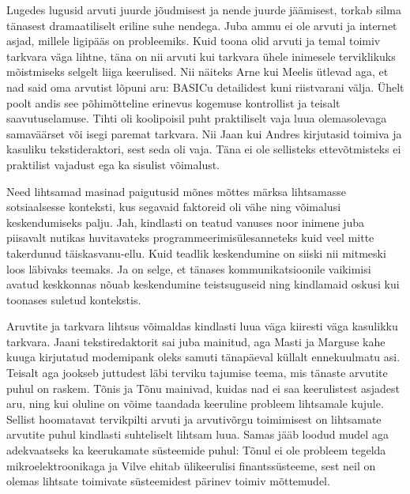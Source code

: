 Lugedes lugusid arvuti juurde jõudmisest ja nende juurde jäämisest, torkab silma tänasest dramaatiliselt eriline suhe nendega. Juba ammu ei ole arvuti ja internet asjad, millele ligipääs on probleemiks. Kuid toona olid arvuti ja temal toimiv tarkvara väga lihtne, täna on nii arvuti kui tarkvara ühele inimesele terviklikuks mõistmiseks selgelt liiga keerulised. Nii näiteks Arne kui Meelis ütlevad aga, et nad said oma arvutist lõpuni aru: BASICu detailidest kuni riistvarani välja. Ühelt poolt andis see põhimõtteline erinevus kogemuse kontrollist ja teisalt saavutuselamuse. Tihti oli koolipoisil puht praktiliselt vaja luua olemasolevaga samaväärset või isegi paremat tarkvara. Nii Jaan kui Andres kirjutasid  toimiva ja kasuliku tekstideraktori, sest seda oli vaja. Täna ei ole sellisteks ettevõtmisteks ei praktilist vajadust ega ka sisulist võimalust. 

Need lihtsamad masinad paigutusid mõnes mõttes märksa lihtsamasse sotsiaalsesse konteksti, kus segavaid faktoreid oli vähe ning võimalusi keskendumiseks palju. Jah, kindlasti on teatud vanuses noor inimene juba piisavalt nutikas huvitavateks programmeerimisülesanneteks kuid veel mitte takerdunud täiskasvanu-ellu. Kuid teadlik keskendumine on siiski nii mitmeski loos läbivaks teemaks. Ja on selge, et tänases kommunikatsioonile vaikimisi avatud keskkonnas nõuab keskendumine teistsuguseid ning kindlamaid oskusi kui toonases suletud kontekstis. 

Aruvtite ja tarkvara lihtsus võimaldas kindlasti luua väga kiiresti väga kasulikku tarkvara. Jaani tekstiredaktorit sai juba mainitud, aga Masti ja Marguse kahe kuuga kirjutatud modemipank oleks samuti tänapäeval küllalt ennekuulmatu asi. Teisalt aga jookseb juttudest läbi terviku tajumise teema, mis tänaste arvutite puhul on raskem. Tõnis ja Tõnu mainivad, kuidas nad ei saa keerulistest asjadest aru, ning kui oluline on võime taandada keeruline probleem lihtsamale kujule. Sellist hoomatavat tervikpilti arvuti ja arvutivõrgu toimimisest on lihtsamate arvutite puhul kindlasti suhteliselt lihtsam luua. Samas jääb loodud mudel aga adekvaatseks ka keerukamate süsteemide puhul: Tõnul ei ole probleem tegelda mikroelektroonikaga ja Vilve ehitab ülikeerulisi finantssüsteeme, sest neil on olemas lihtsate toimivate süsteemidest pärinev toimiv mõttemudel.

